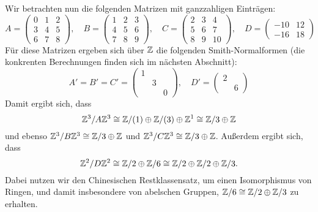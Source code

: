 \documentclass[a4paper,10pt,numbers=noenddot]{scrartcl}
\begin{document}
Wir betrachten nun die folgenden Matrizen mit ganzzahligen Einträgen:
\[
    A
  = \begin{pmatrix}
      0 & 1 & 2 \\
      3 & 4 & 5 \\
      6 & 7 & 8
    \end{pmatrix},
  \quad
    B
  = \begin{pmatrix}
      1 & 2 & 3 \\
      4 & 5 & 6 \\
      7 & 8 & 9
    \end{pmatrix},
  \quad
    C
  = \begin{pmatrix}
      2 & 3 &  4  \\
      5 & 6 &  7  \\
      8 & 9 & 10
    \end{pmatrix},
  \quad
    D
  = \begin{pmatrix}
      -10 & 12  \\
      -16 & 18
    \end{pmatrix}
\]
Für diese Matrizen ergeben sich über $\mathbb{Z}$ die folgenden Smith-Normalformen (die konkrenten Berechnungen finden sich im nächsten Abschnitt):
\[
    A'
  = B'
  = C'
  = \begin{pmatrix}
      1 &   &   \\
        & 3 &   \\
        &   & 0
    \end{pmatrix},
  \quad
    D'
  = \begin{pmatrix}
      2 &    \\
        & 6
    \end{pmatrix}
\]
Damit ergibt sich, dass
\[
        \mathbb{Z}^3 / A \mathbb{Z}^3
  \cong \mathbb{Z}/(1) \oplus \mathbb{Z}/(3) \oplus \mathbb{Z}^1
  \cong \mathbb{Z}/3 \oplus \mathbb{Z}
\]
und ebenso $\mathbb{Z}^3 / B \mathbb{Z}^3 \cong \mathbb{Z}/3 \oplus \mathbb{Z}$ und $\mathbb{Z}^3 / C \mathbb{Z}^3 \cong \mathbb{Z}/3 \oplus \mathbb{Z}$.
Außerdem ergibt sich, dass
\[
        \mathbb{Z}^2 / D \mathbb{Z}^2
  \cong \mathbb{Z}/2 \oplus \mathbb{Z}/6
  \cong \mathbb{Z}/2 \oplus \mathbb{Z}/2 \oplus \mathbb{Z}/3.
\]
Dabei nutzen wir den Chinesischen Restklassensatz, um einen Iso\-mor\-phis\-mus von Ringen, und damit insbesondere von abelschen Gruppen, $\mathbb{Z}/6 \cong \mathbb{Z}/2 \oplus \mathbb{Z}/3$ zu erhalten.





\appendix
\end{document}
